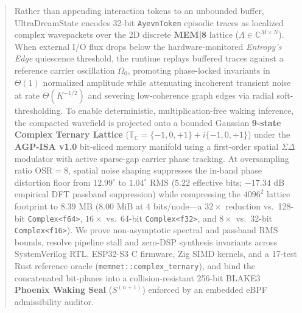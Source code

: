\documentclass[10pt, twocolumn, a4paper]{article}
\begin{document}
\begin{abstract}
Rather than appending interaction tokens to an unbounded buffer, UltraDreamState encodes 32-bit \texttt{AyevnToken} episodic traces as localized complex wavepackets over the 2D discrete \textbf{MEM|8} lattice ($\Lambda \in \mathbb{C}^{M \times N}$). When external I/O flux drops below the hardware-monitored \textit{Entropy's Edge} quiescence threshold, the runtime replays buffered traces against a reference carrier oscillation $\Omega_0$, promoting phase-locked invariants in $\Theta(1)$ normalized amplitude while attenuating incoherent transient noise at rate $\Theta(K^{-1/2})$ and severing low-coherence graph edges via radial soft-thresholding. To enable deterministic, multiplication-free waking inference, the compacted wavefield is projected onto a bounded Gaussian \textbf{9-state Complex Ternary Lattice} ($\mathbb{T}_{\mathbb{C}} = \{-1, 0, +1\} + i\{-1, 0, +1\}$) under the \textbf{AGP-ISA v1.0} bit-sliced memory manifold using a first-order spatial $\Sigma\Delta$ modulator with active sparse-gap carrier phase tracking. At oversampling ratio $\text{OSR} = 8$, spatial noise shaping suppresses the in-band phase distortion floor from $12.99^\circ$ to $1.04^\circ\text{ RMS}$ ($5.22$ effective bits; $-17.34\text{ dB}$ empirical DFT passband suppression) while compressing the $4096^2$ lattice footprint to $8.39\text{ MB}$ ($8.00\text{ MiB}$ at 4 bits/node---a $32\times$ reduction vs.\ 128-bit \texttt{Complex<f64>}, $16\times$ vs.\ 64-bit \texttt{Complex<f32>}, and $8\times$ vs.\ 32-bit \texttt{Complex<f16>}). We prove non-asymptotic spectral and passband RMS bounds, resolve pipeline stall and zero-DSP synthesis invariants across SystemVerilog RTL, ESP32-S3 C firmware, Zig SIMD kernels, and a 17-test Rust reference oracle (\texttt{memnet::complex\_ternary}), and bind the concatenated bit-planes into a collision-resistant 256-bit BLAKE3 \textbf{Phoenix Waking Seal} ($S^{(n+1)}$) enforced by an embedded eBPF admissibility auditor.
\end{abstract}
\end{document}
